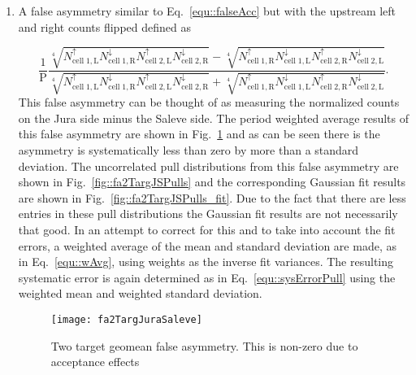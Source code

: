 \begin{enumerate}
  \label{tab::additionalFA}

\item A false asymmetry similar to Eq.~\ref{equ::falseAcc} but with the upstream
  left and right counts flipped defined as
  
  \begin{equation}
    \label{equ::additionalfalseAsym}
    \frac{1}{\mathrm{P}}
    \frac{
      \sqrt[4]{
        N_{\mathrm{cell\;1,L}}^{\uparrow}N_{\mathrm{cell\;1,R}}^{\downarrow}
        N_{\mathrm{cell\;2,L}}^{\uparrow}N_{\mathrm{cell\;2,R}}^{\downarrow}
      } -
      \sqrt[4]{
        N_{\mathrm{cell\;1,R}}^{\uparrow}N_{\mathrm{cell\;1,L}}^{\downarrow}
        N_{\mathrm{cell\;2,R}}^{\uparrow}N_{\mathrm{cell\;2, L}}^{\downarrow}
      }
    }{
      \sqrt[4]{
        N_{\mathrm{cell\;1,L}}^{\uparrow}N_{\mathrm{cell\;1,R}}^{\downarrow}
        N_{\mathrm{cell\;2,L}}^{\uparrow}N_{\mathrm{cell\;2, R}}^{\downarrow}
      } +
      \sqrt[4]{
        N_{\mathrm{cell\;1,R}}^{\uparrow}N_{\mathrm{cell\;1,L}}^{\downarrow}
        N_{\mathrm{cell\;2,R}}^{\uparrow}N_{\mathrm{cell\;2, L}}^{\downarrow}
      }
    }.
  \end{equation}
  This false asymmetry can be thought of as measuring the normalized counts on
  the Jura side minus the Saleve side.  The period weighted average results of
  this false asymmetry are shown in Fig.~\ref{fig::fa2TargJuraSaleve} and as can
  be seen there is the asymmetry is systematically less than zero by more than a
  standard deviation.  The uncorrelated pull distributions from this false
  asymmetry are shown in Fig.~\ref{fig::fa2TargJSPulls} and the corresponding
  Gaussian fit results are shown in Fig.~\ref{fig::fa2TargJSPulls_fit}.  Due to
  the fact that there are less entries in these pull distributions the Gaussian
  fit results are not necessarily that good.  In an attempt to correct for this
  and to take into account the fit errors, a weighted average of the mean and
  standard deviation are made, as in Eq.~\ref{equ::wAvg}, using weights as the
  inverse fit variances.  The resulting systematic error is again determined as
  in Eq.~\ref{equ::sysErrorPull} using the weighted mean and weighted standard
  deviation.

  \begin{figure}[h!t]
    \centering
    \texttt{[image: fa2TargJuraSaleve]}
    \caption{Two target geomean false asymmetry.  This is non-zero due to
      acceptance effects}
    \label{fig::fa2TargJuraSaleve}
  \end{figure}
  

\end{enumerate}
